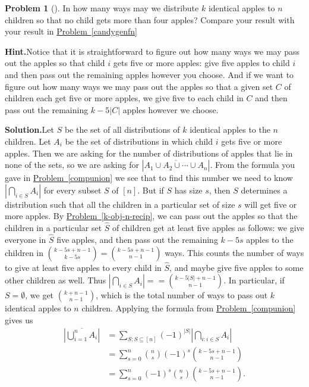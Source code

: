 \documentclass[10pt,]{book}
\theoremstyle{plain}
\theoremstyle{definition}
\newtheorem{activity}[project]{Problem}
\theoremstyle{definition}
\numberwithin{equation}{chapter}
\begin{document}
\begin{activity}[]\label{activity-235}
In how many ways may we distribute \(k\) identical apples to \(n\) children so that no child gets more than four apples? Compare your result with your result in \hyperref[candygenfn]{Problem~\ref{candygenfn}}%
\par\medskip\noindent%
\textbf{Hint.}\quad Notice that it is straightforward to figure out how many ways we may pass out the apples so that child \(i\) gets five or more apples: give five apples to child \(i\) and then pass out the remaining apples however you choose. And if  we want to figure out how many ways we may pass out the apples so that a given set \(C\) of children each get five or more apples, we give five to each child in \(C\) and then pass out the remaining \(k-5|C|\) apples however we choose.%
\par\medskip\noindent%
\textbf{Solution.}\quad Let \(S\) be the set of all distributions of \(k\) identical apples to the \(n\) children. Let \(A_i\) be the set of distributions in which child \(i\) gets five or more apples. Then we are asking for the number of distributions of apples that lie in none of the sets, so we are asking for \(|\overline{A_1\cup A_2\cup \cdots \cup A_n}|\). From the formula you gave in \hyperref[compunion]{Problem~\ref{compunion}} we see that to find this number we need to know \(|\bigcap_{i\in S}A_i|\) for every subset \(S\) of \([n]\). But if \(S\) has size \(s\), then \(S\) determines a distribution such that all the children in a particular set of size \(s\) will get five or more apples. By \hyperref[k-obj-n-recip]{Problem~\ref{k-obj-n-recip}}, we can pass out the apples so that the children in a particular set \(\hat S\) of children get at least five apples as follows: we give everyone in \(\hat
S\) five apples, and then pass out the remaining \(k-5s\) apples to the children in \(\binom{k-5s+n-1}{k-5s}= \binom{k-5s+n-1}{n-1}\) ways. This counts the number of ways to give at least five apples to every child in \(\hat S\), and maybe give five apples to some other children as well. Thus \(|\bigcap_{i\in S}A_i| = = \binom{k-5|S|+n-1}{n-1}\). In particular, if \(S=\emptyset\), we get \(\binom{k+n-1}{n-1}\), which is the total number of ways to pass out \(k\) identical apples to \(n\) children. Applying the formula from \hyperref[compunion]{Problem~\ref{compunion}} gives us%
\begin{align*}
\left| \overline{\bigcup_{i=1}^n A_i}\right|&= \sum_{S:S\subseteq [n]}(-1)^{|S|}\left|\bigcap _{i\colon i\in S} A_i\right|\\
&= \sum_{s=0}^n \binom{n}{s}(-1)^s \binom{k-5s+n-1}{n-1}\\
&= \sum_{s=0}^n (-1)^s\binom{n}{s}\binom{k-5s+n-1}{n-1}\text{.}
\end{align*}
%
\end{activity}
\typeout{************************************************}
\typeout{************************************************}
\end{document}
